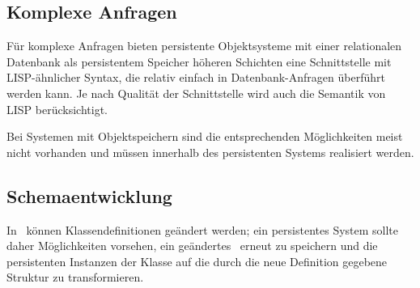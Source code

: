 \subsection{Komplexe Anfragen}
%
F\"{u}r komplexe Anfragen bieten persistente Objektsysteme mit einer
relationalen Datenbank als persistentem Speicher h\"{o}heren Schichten
eine Schnittstelle mit LISP-\"{a}hnlicher Syntax, die relativ einfach in
Datenbank-Anfragen \"{u}berf\"{u}hrt werden kann. Je nach Qualit\"{a}t der
Schnittstelle wird auch die Semantik von LISP ber\"{u}cksichtigt.
%
\par{}Bei Systemen mit Objektspeichern sind die entsprechenden
M\"{o}glichkeiten meist nicht vorhanden und m\"{u}ssen innerhalb des
persistenten Systems realisiert werden.
%
\subsection{Schemaentwicklung}
%
In \clos\ k\"{o}nnen Klassendefinitionen ge\"{a}ndert werden; ein
persistentes System sollte daher M\"{o}g\-lich\-kei\-ten vorsehen, ein
ge\"{a}ndertes \clsmo\ erneut zu speichern und die persistenten Instanzen
der Klasse auf die durch die neue Definition gegebene Struktur zu
transformieren.
%
